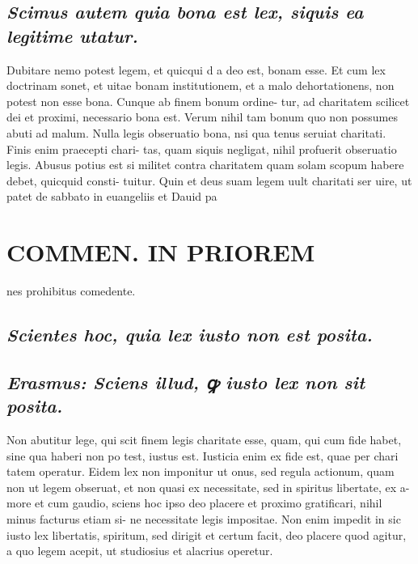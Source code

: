 \documentclass{article}
\begin{document}
\begin{pages}
\subsection*{\textit{Scimus autem quia bona est lex, siquis ea legitime utatur. }}\pstart Dubitare nemo potest legem, et quicqui d a deo est, bonam esse. Et cum lex doctrinam sonet, et uitae bonam institutionem, et a malo dehortationens, non potest non esse bona. Cunque ab finem bonum ordine- tur, ad charitatem scilicet dei et proximi, necessario bona est. Verum nihil tam bonum quo non possumes abuti ad malum. Nulla legis obseruatio bona, nsi qua tenus seruiat charitati. Finis enim praecepti chari- tas, quam siquis negligat, nihil profuerit obseruatio legis. Abusus potius est si militet contra charitatem quam solam scopum habere debet, quicquid consti- tuitur. Quin et deus suam legem uult charitati ser uire, ut patet de sabbato in euangeliis et Dauid pa  \pend
\section*{COMMEN. IN PRIOREM }
\marginpar{[ p.18 ]}\pstart nes prohibitus comedente.  \pend
{}
{}
\subsection*{\textit{Scientes hoc, quia lex iusto non est posita. }}
{}
\subsection*{\textit{Erasmus: Sciens illud, ꝙ iusto lex non sit posita. }}\pstart Non abutitur lege, qui scit finem legis charitate esse, quam, qui cum fide habet, sine qua haberi non po test, iustus est. Iusticia enim ex fide est, quae per chari tatem operatur. Eidem lex non imponitur ut onus, sed regula actionum, quam non ut legem obseruat, et non quasi ex necessitate, sed in spiritus libertate, ex a- more et cum gaudio, sciens hoc ipso deo placere et proximo gratificari, nihil minus facturus etiam si- ne necessitate legis impositae. Non enim impedit in sic iusto lex libertatis, spiritum, sed dirigit et certum facit, deo placere quod agitur, a quo legem acepit, ut studiosius et alacrius operetur.  \pend
{}
{}

\end{pages}
\end{document}
